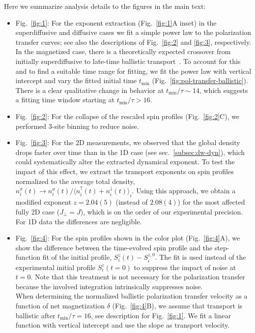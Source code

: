\documentclass[
 reprint,
 superscriptaddress,
 amsmath,amssymb,
 aps,
 pra,
]{revtex4-2}
\newcommand{\avg}[1]{\ensuremath{\langle #1 \rangle}\xspace}%
\begin{document}
Here we summarize analysis details to the figures in the main text:
\begin{itemize}
    \item Fig.~\ref{fig:1}: For the exponent extraction (Fig.~\ref{fig:1}A inset) in the superdiffusive and diffusive cases we fit a simple power law to the polarization transfer curves; see also the descriptions of Fig.~\ref{fig:2} and \ref{fig:3}, respectively. In the magnetized case, there is a theoretically expected crossover from initially superdiffusive to late-time ballistic transport~\cite{Gopalakrishnan2019}. To account for this and to find a suitable time range for fitting, we fit the power law with vertical intercept and vary the fitted initial time $t_\mathrm{min}$ (Fig.~\ref{fig:pol-transfer-ballistic}). There is a clear qualitative change in behavior at $t_\mathrm{min}/\tau \sim 14$, which suggests a fitting time window starting at $t_\mathrm{min}/\tau > 16$.
    \item Fig.~\ref{fig:2}: For the collapse of the rescaled spin profiles (Fig.~\ref{fig:2}C), we performed 3-site binning to reduce noise.
    \item Fig.~\ref{fig:3}: For the 2D measurements, we observed that the global density drops faster over time than in the 1D case (see sec.~\ref{subsec:dw-dyn}), which could systematically alter the extracted dynamical exponent. To test the impact of this effect, we extract the transport exponents on spin profiles normalized to the average total density, $n_i^\sigma (t) \to n_i^\sigma (t) / \avg{n_i^\uparrow (t) + n_i^\downarrow (t)}_i$. Using this approach, we obtain a modified exponent $z = 2.04(5)$ (instead of $2.08(4)$) for the most affected fully 2D case ($J_\perp = J$), which is on the order of our experimental precision. For 1D data the differences are negligible.
    \item Fig.~\ref{fig:4}: For the spin profiles shown in the color plot (Fig.~\ref{fig:4}A), we show the difference between the time-evolved spin profile and the step-function fit of the initial profile, $S_i^z (t) - S_i^{z,0}$. The fit is used instead of the experimental initial profile $S_i^z (t=0)$ to suppress the impact of noise at $t=0$. Note that this treatment is not necessary for the polarization transfer because the involved integration intrinsically suppresses noise.\\
    When determining the normalized ballistic polarization transfer velocity as a function of net magnetization $\delta$ (Fig.~\ref{fig:4}B), we assume that transport is ballistic after $t_\mathrm{min}/\tau = 16$, see description for Fig.~\ref{fig:1}. We fit a linear function with vertical intercept and use the slope as transport velocity.

\end{itemize}
\end{document}
